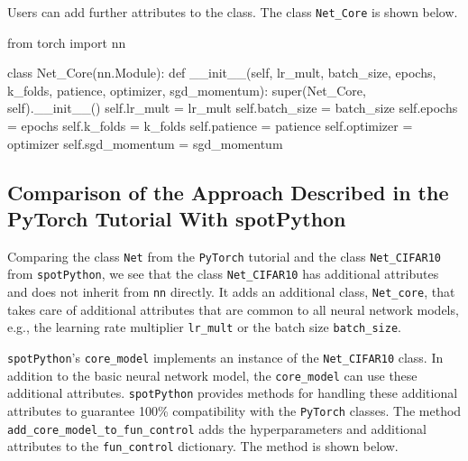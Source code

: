 \documentclass[
  letterpaper,
  DIV=11,
  numbers=noendperiod]{scrreprt}
\newenvironment{Shaded}{\begin{snugshade}}{\end{snugshade}}
\newcommand{\NormalTok}[1]{\textcolor[rgb]{0.00,0.23,0.31}{#1}}
\begin{document}
Users can add further attributes to the class. The class
\texttt{Net\_Core} is shown below.

\begin{Shaded}
\begin{Highlighting}[]
\NormalTok{from torch import nn}


\NormalTok{class Net\_Core(nn.Module):}
\NormalTok{    def \_\_init\_\_(self, lr\_mult, batch\_size, epochs, k\_folds, patience,}
\NormalTok{        optimizer, sgd\_momentum):}
\NormalTok{        super(Net\_Core, self).\_\_init\_\_()}
\NormalTok{        self.lr\_mult = lr\_mult}
\NormalTok{        self.batch\_size = batch\_size}
\NormalTok{        self.epochs = epochs}
\NormalTok{        self.k\_folds = k\_folds}
\NormalTok{        self.patience = patience}
\NormalTok{        self.optimizer = optimizer}
\NormalTok{        self.sgd\_momentum = sgd\_momentum}
\end{Highlighting}
\end{Shaded}

\hypertarget{sec-comparison}{%
\subsection{Comparison of the Approach Described in the PyTorch Tutorial
With spotPython}\label{sec-comparison}}

Comparing the class \texttt{Net} from the \texttt{PyTorch} tutorial and
the class \texttt{Net\_CIFAR10} from \texttt{spotPython}, we see that
the class \texttt{Net\_CIFAR10} has additional attributes and does not
inherit from \texttt{nn} directly. It adds an additional class,
\texttt{Net\_core}, that takes care of additional attributes that are
common to all neural network models, e.g., the learning rate multiplier
\texttt{lr\_mult} or the batch size \texttt{batch\_size}.

\texttt{spotPython}'s \texttt{core\_model} implements an instance of the
\texttt{Net\_CIFAR10} class. In addition to the basic neural network
model, the \texttt{core\_model} can use these additional attributes.
\texttt{spotPython} provides methods for handling these additional
attributes to guarantee 100\% compatibility with the \texttt{PyTorch}
classes. The method \texttt{add\_core\_model\_to\_fun\_control} adds the
hyperparameters and additional attributes to the \texttt{fun\_control}
dictionary. The method is shown below.
\end{document}
